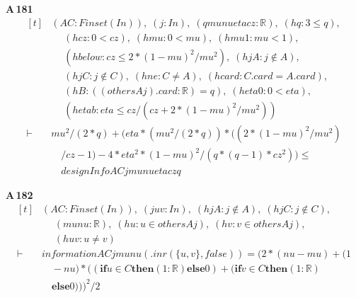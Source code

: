 \noindent\textbf{A\,181}\quad{}
{\footnotesize\[ \begin{aligned}[t]
&(\mathit{A} \mathit{C} : \mathit{Finset} (\mathit{I} \mathit{n})),\; (\mathit{j} : \mathit{I} \mathit{n}),\; (\mathit{q} \mathit{mu} \mathit{nu} \mathit{eta} \mathit{cz} : \mathbb{R} ),\; (\mathit{hq} : 3 \leq \mathit{q}),\\
&\quad \; (\mathit{hcz} : 0 < \mathit{cz}),\; (\mathit{hmu} : 0 < \mathit{mu}),\; (\mathit{hmu1} : \mathit{mu} < 1),\\
&\quad \; (\mathit{hbelow} : \mathit{cz} \leq 2*(1-\mathit{mu})^{2}/\mathit{mu}^{2}),\; (\mathit{hjA} : \mathit{j} \notin \mathit{A}),\\
&\quad \; (\mathit{hjC} : \mathit{j} \notin \mathit{C}),\; (\mathit{hne} : \mathit{C} \neq \mathit{A}),\; (\mathit{hcard} : \mathit{C}.\mathit{card} = \mathit{A}.\mathit{card}),\\
&\quad \; (\mathit{hB} : ((\mathit{others} \mathit{A} \mathit{j}).\mathit{card} : \mathbb{R} ) = \mathit{q}),\; (\mathit{heta0} : 0 < \mathit{eta}),\\
&\quad \; (\mathit{hetab} : \mathit{eta} \leq \mathit{cz}/(\mathit{cz}+2*(1-\mathit{mu})^{2}/\mathit{mu}^{2}))\\
\vdash\;&\mathit{mu}^{2}/(2*\mathit{q}) + (\mathit{eta}*(\mathit{mu}^{2}/(2*\mathit{q}))*((2*(1-\mathit{mu})^{2}/\mathit{mu}^{2})\\
&\quad /\mathit{cz}-1) - 4*\mathit{eta}^{2}*(1-\mathit{mu})^{2}/(\mathit{q}*(\mathit{q}-1)*\mathit{cz}^{2})) \leq\\
&\quad \mathit{designInfo} \mathit{A} \mathit{C} \mathit{j} \mathit{mu} \mathit{nu} \mathit{eta} \mathit{cz} \mathit{q}
\end{aligned} \]}

\noindent\textbf{A\,182}\quad{}
{\footnotesize\[ \begin{aligned}[t]
&(\mathit{A} \mathit{C} : \mathit{Finset} (\mathit{I} \mathit{n})),\; (\mathit{j} \mathit{u} \mathit{v} : \mathit{I} \mathit{n}),\; (\mathit{hjA} : \mathit{j} \notin \mathit{A}),\; (\mathit{hjC} : \mathit{j} \notin \mathit{C}),\\
&\quad \; (\mathit{mu} \mathit{nu} : \mathbb{R} ),\; (\mathit{hu} : \mathit{u} \in \mathit{others} \mathit{A} \mathit{j}),\; (\mathit{hv} : \mathit{v} \in \mathit{others} \mathit{A} \mathit{j}),\\
&\quad \; (\mathit{huv} : \mathit{u} \neq \mathit{v})\\
\vdash\;&\mathit{information} \mathit{A} \mathit{C} \mathit{j} \mathit{mu} \mathit{nu} (.\mathit{inr} (\{ \mathit{u},\mathit{v}\} ,\mathit{false})) = (2*(\mathit{nu}-\mathit{mu})+(1\\
&\quad -\mathit{nu})*((\mathbf{if} \mathit{u} \in \mathit{C} \mathbf{then} (1:\mathbb{R} ) \mathbf{else} 0)+(\mathbf{if} \mathit{v} \in \mathit{C} \mathbf{then} (1:\mathbb{R} )\\
&\quad \mathbf{else} 0)))^{2}/2
\end{aligned} \]}

